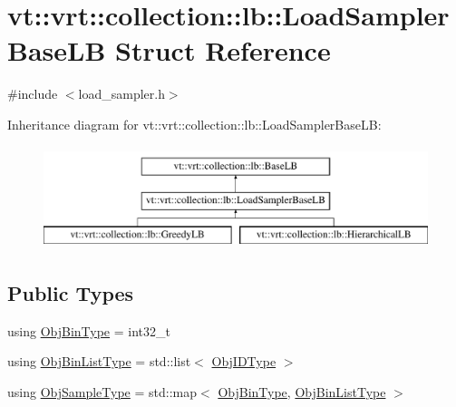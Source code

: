 \hypertarget{structvt_1_1vrt_1_1collection_1_1lb_1_1_load_sampler_base_l_b}{}\section{vt\+:\+:vrt\+:\+:collection\+:\+:lb\+:\+:Load\+Sampler\+Base\+LB Struct Reference}
\label{structvt_1_1vrt_1_1collection_1_1lb_1_1_load_sampler_base_l_b}


{\ttfamily \#include $<$load\+\_\+sampler.\+h$>$}

Inheritance diagram for vt\+:\+:vrt\+:\+:collection\+:\+:lb\+:\+:Load\+Sampler\+Base\+LB\+:\begin{figure}[H]
\begin{center}
\leavevmode
\includegraphics[height=3.000000cm]{structvt_1_1vrt_1_1collection_1_1lb_1_1_load_sampler_base_l_b}
\end{center}
\end{figure}
\subsection*{Public Types}
\begin{DoxyCompactItemize}
\item 
using \hyperlink{structvt_1_1vrt_1_1collection_1_1lb_1_1_load_sampler_base_l_b_acb55af31b27a3c248d351189abd78487}{Obj\+Bin\+Type} = int32\+\_\+t
\item 
using \hyperlink{structvt_1_1vrt_1_1collection_1_1lb_1_1_load_sampler_base_l_b_a58de8f1e1204cf52b661b3906e2d9eeb}{Obj\+Bin\+List\+Type} = std\+::list$<$ \hyperlink{structvt_1_1vrt_1_1collection_1_1lb_1_1_base_l_b_a790b22acf448880599724749cdc4e9b3}{Obj\+I\+D\+Type} $>$
\item 
using \hyperlink{structvt_1_1vrt_1_1collection_1_1lb_1_1_load_sampler_base_l_b_a8d939a849ec0d6371c1c4d441ffb9b94}{Obj\+Sample\+Type} = std\+::map$<$ \hyperlink{structvt_1_1vrt_1_1collection_1_1lb_1_1_load_sampler_base_l_b_acb55af31b27a3c248d351189abd78487}{Obj\+Bin\+Type}, \hyperlink{structvt_1_1vrt_1_1collection_1_1lb_1_1_load_sampler_base_l_b_a58de8f1e1204cf52b661b3906e2d9eeb}{Obj\+Bin\+List\+Type} $>$
\end{DoxyCompactItemize}
